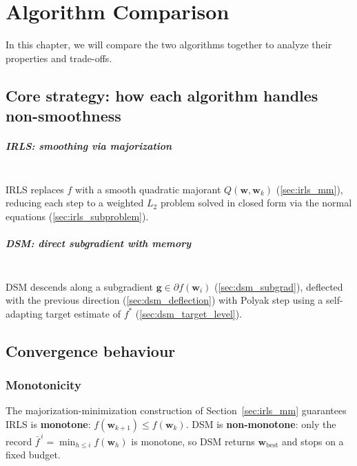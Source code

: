 \chapter{Algorithm Comparison}
\label{chap:comparison}

In this chapter, we will compare the two algorithms together to analyze their properties and trade-offs.

\section{Core strategy: how each algorithm handles non-smoothness}
\label{sec:comp_strategy}

\paragraph{IRLS: smoothing via majorization}\mbox{} \\
IRLS replaces $f$ with a smooth quadratic majorant $Q(\mathbf{w},\mathbf{w}_k)$ (\ref{sec:irls_mm}), reducing each step to a
weighted $L_2$ problem solved in closed form via the normal equations
(\ref{sec:irls_subproblem}).

\paragraph{DSM: direct subgradient with memory}\mbox{} \\
DSM descends along a subgradient $\mathbf{g} \in \partial f(\mathbf{w}_i)$
(\ref{sec:dsm_subgrad}), deflected with the previous direction
(\ref{sec:dsm_deflection}) with Polyak step using
a self-adapting target estimate of $f^*$ (\ref{sec:dsm_target_level}).

\section{Convergence behaviour}
\label{sec:comp_convergence}

\subsection{Monotonicity}

The majorization-minimization construction of Section~\ref{sec:irls_mm} guarantees IRLS is \textbf{monotone}: $f(\mathbf{w}_{k+1}) \leq f(\mathbf{w}_k)$. DSM is
\textbf{non-monotone}: only the record $\bar{f}^{\,i} = \min_{h \leq i} f(\mathbf{w}_h)$
is monotone, so DSM returns $\mathbf{w}_{\mathrm{best}}$ and stops on a fixed budget.

